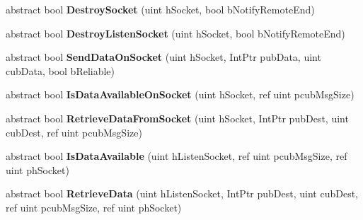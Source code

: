 \begin{DoxyCompactItemize}
\item 
\hypertarget{classValve_1_1Steamworks_1_1ISteamNetworking_a7f98a6261ed4cdd20deadb65082133da}{}abstract bool {\bfseries Destroy\+Socket} (uint h\+Socket, bool b\+Notify\+Remote\+End)\label{classValve_1_1Steamworks_1_1ISteamNetworking_a7f98a6261ed4cdd20deadb65082133da}

\item 
\hypertarget{classValve_1_1Steamworks_1_1ISteamNetworking_aa20e814e8d0ecd4aa6d8521da91a7e81}{}abstract bool {\bfseries Destroy\+Listen\+Socket} (uint h\+Socket, bool b\+Notify\+Remote\+End)\label{classValve_1_1Steamworks_1_1ISteamNetworking_aa20e814e8d0ecd4aa6d8521da91a7e81}

\item 
\hypertarget{classValve_1_1Steamworks_1_1ISteamNetworking_aa1aac13d1eb9eae81245a1900810dfbe}{}abstract bool {\bfseries Send\+Data\+On\+Socket} (uint h\+Socket, Int\+Ptr pub\+Data, uint cub\+Data, bool b\+Reliable)\label{classValve_1_1Steamworks_1_1ISteamNetworking_aa1aac13d1eb9eae81245a1900810dfbe}

\item 
\hypertarget{classValve_1_1Steamworks_1_1ISteamNetworking_aab9b9f7aadee3e0b75543ca3900faf81}{}abstract bool {\bfseries Is\+Data\+Available\+On\+Socket} (uint h\+Socket, ref uint pcub\+Msg\+Size)\label{classValve_1_1Steamworks_1_1ISteamNetworking_aab9b9f7aadee3e0b75543ca3900faf81}

\item 
\hypertarget{classValve_1_1Steamworks_1_1ISteamNetworking_a24987cc5c67199978d17c3163d0d8794}{}abstract bool {\bfseries Retrieve\+Data\+From\+Socket} (uint h\+Socket, Int\+Ptr pub\+Dest, uint cub\+Dest, ref uint pcub\+Msg\+Size)\label{classValve_1_1Steamworks_1_1ISteamNetworking_a24987cc5c67199978d17c3163d0d8794}

\item 
\hypertarget{classValve_1_1Steamworks_1_1ISteamNetworking_a27e910ec24b1cf1c919f10e193a8678a}{}abstract bool {\bfseries Is\+Data\+Available} (uint h\+Listen\+Socket, ref uint pcub\+Msg\+Size, ref uint ph\+Socket)\label{classValve_1_1Steamworks_1_1ISteamNetworking_a27e910ec24b1cf1c919f10e193a8678a}

\item 
\hypertarget{classValve_1_1Steamworks_1_1ISteamNetworking_ab576bae8fa03d0d64f61ec850a28037d}{}abstract bool {\bfseries Retrieve\+Data} (uint h\+Listen\+Socket, Int\+Ptr pub\+Dest, uint cub\+Dest, ref uint pcub\+Msg\+Size, ref uint ph\+Socket)\label{classValve_1_1Steamworks_1_1ISteamNetworking_ab576bae8fa03d0d64f61ec850a28037d}


\end{DoxyCompactItemize}
